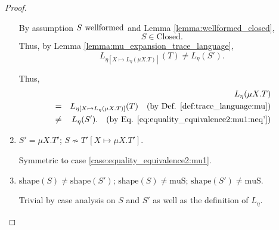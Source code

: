 \documentclass{llncs}
\newcommand*{\shape}{\mathrm{shape}}
\newcommand*{\muS}{\mathrm{muS}}
\newcommand*{\Closed}{\mathrm{Closed}}
\newcommand*{\nsequiv}{\not\sim}
\newcommand*{\wf}[1]{\text{$#1$ {\normalfont \rmfamily wellformed}}}
\renewcommand*{\|}{\;|\;}
\begin{document}
\begin{proof}
\begin{enumerate}
      By assumption $\wf{S}$ and Lemma \ref{lemma:wellformed_closed},
      \begin{equation*}
        S \in \Closed.
      \end{equation*}
      Thus, by Lemma \ref{lemma:mu_expansion_trace_language},
      \begin{equation}
        \label{eq:equality_equivalence2:mu1:neq'}
        L_{\eta[X \mapsto L_\eta(\mu X.T)]}(T) \neq L_\eta(S').
      \end{equation}

      Thus,
      \begin{eqnarray*}
        &&     L_\eta(\mu X.T) \\
        &=&    L_{\eta[X \mapsto L_\eta(\mu X.T)]}(T)
               \quad \text{(by Def. \ref{def:trace_language:mu})} \\
        &\neq& L_\eta(S').
               \quad \text{(by Eq. \ref{eq:equality_equivalence2:mu1:neq'})}
      \end{eqnarray*}

    \item
      \label{case:equality_equivalence2:mu2}
      $S' = \mu X.T'$; $S \nsequiv T'[X \mapsto \mu X.T']$.

      Symmetric to case \ref{case:equality_equivalence2:mu1}.

    \item
      \label{case:equality_equivalence2:shape}
      $\shape(S) \neq \shape(S')$; $\shape(S) \neq \muS$; $\shape(S') \neq \muS$.

      Trivial by case analysis on $S$ and $S'$ as well as the definition
      of $L_\eta$.
  \end{enumerate}
\end{proof}
\end{document}
